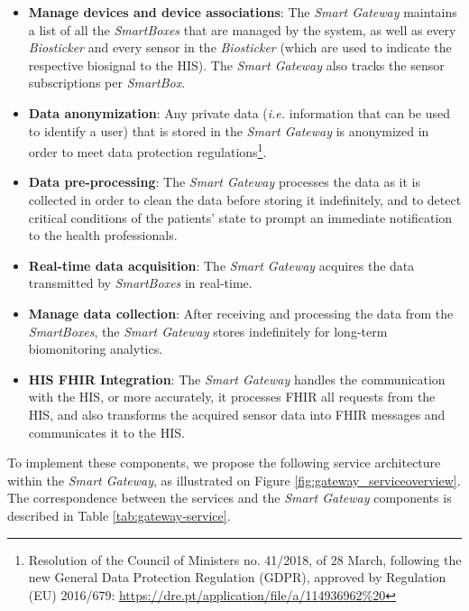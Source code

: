 \begin{itemize}
    \item \textbf{Manage devices and device associations}: The \textit{Smart Gateway} maintains a list of all the \textit{SmartBoxes} that are managed by the system, as well as every \textit{Biosticker} and every sensor in the \textit{Biosticker} (which are used to indicate the respective biosignal to the \acs{HIS}). The \textit{Smart Gateway} also tracks the sensor subscriptions per \textit{SmartBox}.
    \item \textbf{Data anonymization}: Any private data (\textit{i.e.} information that can be used to identify a user) that is stored in the \textit{Smart Gateway} is anonymized in order to meet data protection regulations\footnote{Resolution of the Council of Ministers no. 41/2018, of 28 March, following the new General Data Protection Regulation (GDPR), approved by Regulation (EU) 2016/679:  \url{https://dre.pt/application/file/a/114936962\%20}}. 
    \item \textbf{Data pre-processing}: The \textit{Smart Gateway} processes the data as it is collected in order to clean the data before storing it indefinitely, and to detect critical conditions of the patients' state to prompt an immediate notification to the health professionals.
    \item \textbf{Real-time data acquisition}: The \textit{Smart Gateway} acquires the data transmitted by \textit{SmartBoxes} in real-time. 
    \item \textbf{Manage data collection}: After receiving and processing the data from the \textit{SmartBoxes}, the \textit{Smart Gateway} stores indefinitely for long-term biomonitoring analytics.
    \item \textbf{\acs{HIS} \acs{FHIR} Integration}: The \textit{Smart Gateway} handles the communication with the \acs{HIS}, or more accurately, it processes \acs{FHIR} all requests from the \acs{HIS}, and also transforms the acquired sensor data into \acs{FHIR} messages and communicates it to the \acs{HIS}. 
\end{itemize}

To implement these components, we propose the following service architecture within the \textit{Smart Gateway}, as illustrated on Figure \ref{fig:gateway_serviceoverview}. The correspondence between the services and the \textit{Smart Gateway} components is described in Table \ref{tab:gateway-service}.

